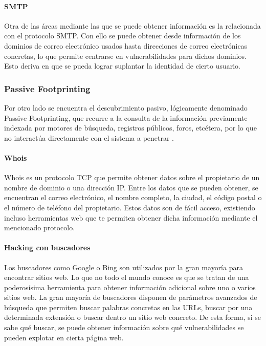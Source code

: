 \paragraph{SMTP}

Otra de las áreas mediante las que se puede obtener información es la relacionada con el protocolo SMTP. Con ello se puede obtener desde información de los dominios de correo electrónico usados hasta direcciones de correo electrónicas concretas, lo que permite centrarse en vulnerabilidades para dichos dominios. Esto deriva en que se pueda lograr suplantar la identidad de cierto usuario.

\subsubsection{Passive Footprinting}

Por otro lado se encuentra el descubrimiento pasivo, lógicamente denominado Passive Footprinting, que recurre a la consulta de la información previamente indexada por motores de búsqueda, registros públicos, foros, etcétera, por lo que no interactúa directamente con el sistema a penetrar \cite{pentesting-kali}. 

\paragraph{Whois}

Whois es un protocolo TCP que permite obtener datos sobre el propietario de un nombre de dominio o una dirección IP. Entre los datos que se pueden obtener, se encuentran el correo electrónico, el nombre completo, la ciudad, el código postal o el número de teléfono del propietario. Estos datos son de fácil acceso, existiendo incluso herramientas web que te permiten obtener dicha información mediante el mencionado protocolo.

\paragraph{Hacking con buscadores}

Los buscadores como Google o Bing son utilizados por la gran mayoría para encontrar sitios web. Lo que no todo el mundo conoce es que se tratan de una poderosísima herramienta para obtener información adicional sobre uno o varios sitios web. La gran mayoría de buscadores disponen de parámetros avanzados de búsqueda que permiten buscar palabras concretas en las URLs, buscar por una determinada extensión o buscar dentro un sitio web concreto. De esta forma, si se sabe qué buscar, se puede obtener información sobre qué vulnerabilidades se pueden explotar en cierta página web.

